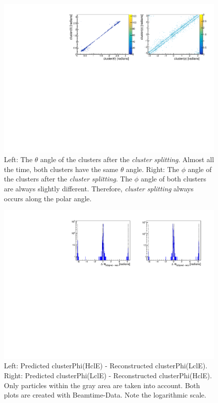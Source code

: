 \documentclass[a4paper,11pt,twosided,final,german,openbib,pdftex,listof=totoc,bibliography=totoc]{scrbook}
\begin{document}
\begin{appendix}
\begin{figure}[H]
	\centering
	\includegraphics[width=\textwidth]{AnhangPlots/ttpp.pdf}
	\caption[Cluster Splitting Angle Distribution]{Left: The $\theta$ angle of the clusters after the \textit{cluster splitting}. Almost all the time, both clusters have the same $\theta$ angle.  Right: The $\phi$ angle of the clusters after the \textit{cluster splitting}. The $\phi$ angle of both clusters are always slightly different. Therefore, \textit{cluster splitting} always occurs along the polar angle.}
	\label{fig:clusterSplittingAngle}
\end{figure}



\begin{figure}[h!]
	\centering
	\includegraphics[width=\textwidth]{Plots/master/sb2b_Data_0.pdf}
	\caption[b2bClusterPhi - clusterPhi For Data (Whole Range)]{Left: Predicted clusterPhi(HclE) - Reconstructed clusterPhi(LclE). Right: Predicted clusterPhi(LclE) - Reconstructed clusterPhi(HclE). Only particles within the gray area are taken into account. Both plots are created with Beamtime-Data. Note the logarithmic scale.}
	\label{fig:b2bData_Whole}
\end{figure}







\end{appendix}
\end{document}
